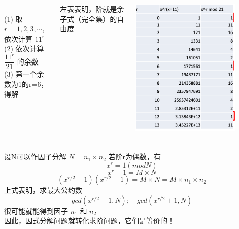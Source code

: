 \begin{frame}
    \frametitle{}    
    \begin{columns}[T,onlytextwidth]
        ~\\ \vspace{5em}
        \例 [试求x=11和N=21的阶r]{} 
        \解 (1) 取$r=1,2,3,\cdots$,依次计算 $11^r$ \\
        (2) 依次计算 $\dfrac{11^r}{21}$ 的余数\\
        (3) 第一个余数为1的r=6，得解\\ \vspace{2em}

        左表表明，阶就是余子式（完全集）的自由度
        \begin{center}
            \includegraphics[width=0.8\textwidth]{figs/38.png}
        \end{center}
    \end{columns}
\end{frame}

\begin{frame}
    \frametitle{}  
    \例 [试证明求阶问题与因式分解问题等价]{}  
    \证 设N可以作因子分解 $N=n_1\times n_2$
    若阶r为偶数，有
        \[x^r= 1 (mod N)\]
        \[x^r-1= M\times N \]
        \[(x^{r/2}-1) (x^{r/2}+1)=  M\times N = M\times n_1\times n_2 \]
    上式表明，求最大公约数
    \[gcd(x^{r/2}-1, N); \quad gcd(x^{r/2}+1, N)\]  
    很可能就能得到因子 $n_1$ 和 $n_2$ \\
    因此，因式分解问题就转化求阶问题，它们是等价的！
\end{frame}

